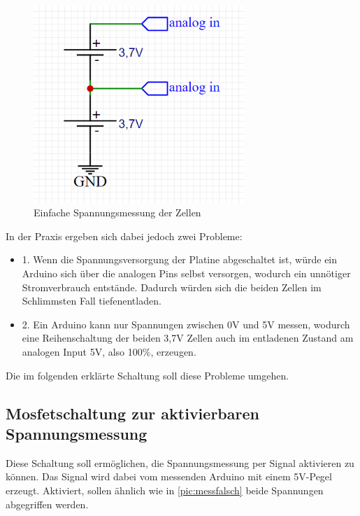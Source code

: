 \begin{figure}[h]
	\begin{center}
		\includegraphics[width=8cm]{wrongMeasure.PNG}
		\caption{\label{pic:messfalsch} Einfache Spannungsmessung der Zellen}
	\end{center}
\end{figure}

In der Praxis ergeben sich dabei jedoch zwei Probleme:

\begin{center}
	\begin{itemize}
		\item 1. Wenn die Spannungsversorgung der Platine abgeschaltet ist, würde ein Arduino sich über die analogen Pins selbst versorgen, wodurch ein unnötiger Stromverbrauch entstände. Dadurch würden sich die beiden Zellen im Schlimmsten Fall tiefenentladen.
		\item 2. Ein Arduino kann nur Spannungen zwischen 0V und 5V messen, wodurch eine Reihenschaltung der beiden 3,7V Zellen auch im entladenen Zustand am analogen Input 5V, also 100\%, erzeugen. 
	\end{itemize}
\end{center}

Die im folgenden erklärte Schaltung soll diese Probleme umgehen.
\subsection{Mosfetschaltung zur aktivierbaren Spannungsmessung}
Diese Schaltung soll ermöglichen, die Spannungsmessung per Signal aktivieren zu können. Das Signal wird dabei vom messenden Arduino mit einem 5V-Pegel erzeugt. Aktiviert, sollen ähnlich wie in \autoref{pic:messfalsch} beide Spannungen abgegriffen werden.

